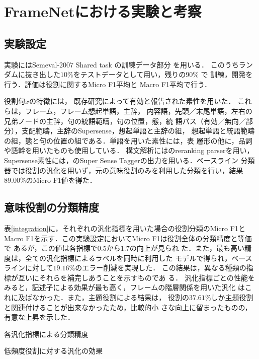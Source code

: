 \documentclass[japanese]{jnlp_1.4}
\begin{document}
\section{FrameNetにおける実験と考察}
\label{sec:experiment-in-framenet}


\subsection{実験設定}

実験にはSemeval-2007 Shared task
の訓練データ部分
を用いる．
このうちランダムに抜き出した$10\%$をテストデータとして用い，残りの$90\%$
で
訓練，開発を行う．評価は役割に関するMicro F1平均と
Macro F1平均で行う．

役割句$x$の特徴には，
既存研究によって有効と報告された素性を用いた．
これらは，フレーム，フレーム想起単語，主辞，
内容語，先頭／末尾単語，左右の兄弟ノードの主辞，句の統語範疇，句の位置，態，統
語パス（有効／無向／部分），支配範疇，主辞のSupersense，想起単語と主辞の組，
想起単語と統語範疇の組，態と句の位置の組である．単語を用いた素性には，表
層形の他に，品詞や語幹を用いたものも使用している．
構文解析にはのreranking
parserを用い，Supersense素性には，のSuper
Sense Taggerの出力を用いる．ベースライン
分類器では役割の汎化を用いず，元の意味役割のみを利用した分類を行い，結果
$89.00\%$のMicro F1値を得た．


\subsection{意味役割の分類精度}

表\ref{integration}に，それぞれの汎化指標を用いた場合の役割分類のMicro
F1とMacro F1を示す．この実験設定においてMicro F1は役割全体の分類精度と等価で
あるが，この値は各指標で$0.5$から$1.7$の向上が見られ
た．また，最も高い精度は，全ての汎化指標によるラベルを同時に利用した
モデルで得られ，ベースラインに対して$19.16\%$のエラー削減を実現した．
この結果は，異なる種類の指標が互いにそれらを補完しあうことを示すものであ
る．
汎化指標ごとの性能をみると，記述子による効果が最も高く，フレームの階層関係を用いた汎化
はこれに及ばなかった．また，主題役割による結果は，
役割の$37.61\%$しか主題役割と関連付けることが出来なかったため，比較的小
さな向上に留まったものの，有意な上昇を示した．

\begin{table}[b]
\begin{minipage}[t]{180pt}
\caption{各汎化指標による分類精度}
\label{integration} 

\end{minipage}
\hfill
\begin{minipage}[t]{230pt}
\caption{低頻度役割に対する汎化の効果}
\label{sparseness}

\end{minipage}
\end{table}
\end{document}
